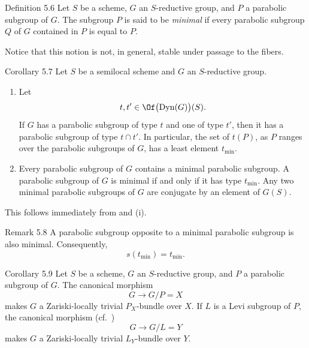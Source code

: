 \begin{sgastatement}{Definition 5.6}
Let \(S\) be a scheme, \(G\) an \(S\)-reductive group, and \(P\) a
parabolic subgroup of \(G\).  The subgroup \(P\) is said to be
\emph{minimal} if every parabolic subgroup \(Q\) of \(G\) contained
in \(P\) is equal to \(P\).
\end{sgastatement}

Notice that this notion is not, in general, stable under passage to
the fibers.

\begin{sgastatement}{Corollary 5.7}
Let \(S\) be a semilocal scheme and \(G\) an \(S\)-reductive group.
\begin{enumerate}[label=\textup{(\roman*)}]
\item Let
\[
 t,t'\in\Of\bigl(\operatorname{Dyn}(G)\bigr)(S).
\]
If \(G\) has a parabolic subgroup of type \(t\) and one of type
\(t'\), then it has a parabolic subgroup of type \(t\cap t'\).  In
particular, the set of \(t(P)\), as \(P\) ranges over the parabolic
subgroups of \(G\), has a least element \(t_{\min}\).
\item Every parabolic subgroup of \(G\) contains a minimal parabolic
subgroup.  A parabolic subgroup of \(G\) is minimal if and only if it
has type \(t_{\min}\).  Any two minimal parabolic subgroups of \(G\)
are conjugate by an element of \(G(S)\).
\end{enumerate}
\end{sgastatement}

This follows immediately from  and \textup{(i)}.

\begin{sgastatement}{Remark 5.8}
A parabolic subgroup opposite to a minimal parabolic subgroup is
also minimal.  Consequently,
\[
 s(t_{\min})=t_{\min}.
\]
\end{sgastatement}

\begin{sgastatement}{Corollary 5.9}
Let \(S\) be a scheme, \(G\) an \(S\)-reductive group, and \(P\) a
parabolic subgroup of \(G\).  The canonical morphism
\[
 G\longrightarrow G/P=X
\]
makes \(G\) a Zariski-locally trivial \(P_X\)-bundle over \(X\).
If \(L\) is a Levi subgroup of \(P\), the canonical morphism
\textup{(cf.\ )}
\[
 G\longrightarrow G/L=Y
\]
makes \(G\) a Zariski-locally trivial \(L_Y\)-bundle over \(Y\).
\end{sgastatement}

